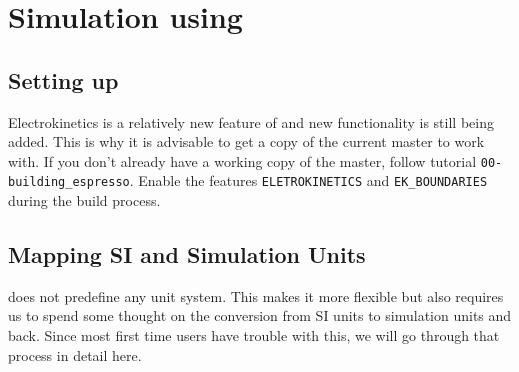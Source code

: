 \section{\label{sec:simulation}Simulation using \ES{}}

\subsection{Setting up \ES{}}

Electrokinetics is a relatively new feature of \ES{} and new functionality is still being added. This is why it is advisable to get a copy of the current \ES{} master to work with. If you don't already have a working copy of the \ES{} master, follow tutorial \texttt{00-building\_espresso}. Enable the features \texttt{ELETROKINETICS} and \texttt{EK\_BOUNDARIES} during the build process.

\subsection{\label{sec:units}Mapping SI and Simulation Units}

\ES{} does not predefine any unit system. This makes it more flexible but also requires us to spend some thought on the conversion from SI units to simulation units and back. Since most first time users have trouble with this, we will go through that process in detail here.
	
